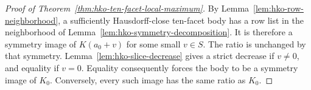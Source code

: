\begin{proof}[Proof of Theorem~\ref{thm:hko-ten-facet-local-maximum}]
By Lemma~\ref{lem:hko-row-neighborhood}, a sufficiently Hausdorff-close
ten-facet body has a row list in the neighborhood of
Lemma~\ref{lem:hko-symmetry-decomposition}. It is therefore a symmetry
image of $K(a_0+v)$ for some small $v\in S$. The ratio is unchanged by
that symmetry. Lemma~\ref{lem:hko-slice-decrease} gives a strict decrease
if $v\ne0$, and equality if $v=0$. Equality consequently forces the
body to be a symmetry image of $K_0$. Conversely, every such image
has the same ratio as $K_0$.
\end{proof}

